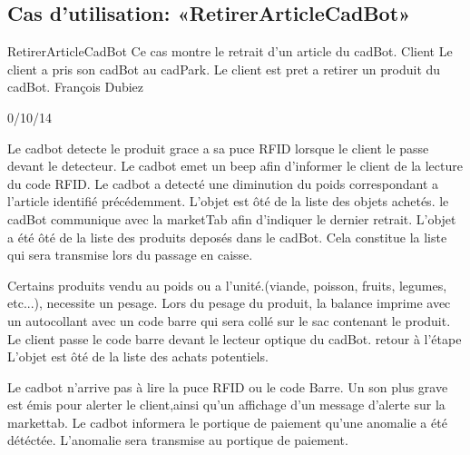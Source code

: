 \subsection{Cas d'utilisation: «RetirerArticleCadBot» }

\startCU
\nom RetirerArticleCadBot
\but Ce cas montre le retrait d'un article du cadBot.
\acteur Client
\precondition Le client a pris son cadBot au cadPark.
\declenchement Le client est pret a retirer un produit du cadBot.
\auteur François Dubiez
\date 30/10/14

\nominal %
\startnominal
\etape[SA1][SA2] Le cadbot detecte le produit grace a sa puce RFID lorsque le client le passe devant le detecteur. 
\etape[RETOUR] Le cadbot emet un beep afin d'informer le client de la lecture du code RFID.
\etape Le cadbot a detecté une diminution du poids correspondant a l'article identifié précédemment.
\etape L'objet est ôté de la liste des objets achetés.
\etape le cadBot communique avec la marketTab afin d'indiquer le dernier retrait.
\stopnominal
\postcondition L'objet a été ôté de la liste des produits deposés dans le cadBot. Cela constitue la liste qui sera transmise lors du passage en caisse.

\alternatifs %
\startalternatif[SA1] %
  \etape Certains produits vendu au poids ou a l'unité.(viande, poisson, fruits, legumes, etc...), necessite un pesage.
  \etape Lors du pesage du produit, la balance imprime avec un autocollant avec un code barre qui sera collé sur le sac contenant le produit.
  \etape Le client passe le code barre devant le lecteur optique du cadBot.
  \etape retour à l'étape \in[RETOUR]
\stopcondition
\postcondition L'objet est ôté de la liste des achats potentiels.
\stopalternatif


\exception %
\startalternatif[SA1]
   \etape Le cadbot n'arrive pas à lire la puce RFID ou le code Barre.
   \etape Un son plus grave est émis pour alerter le client,ainsi qu'un affichage d'un message d'alerte sur la markettab.
   \etape Le cadbot informera le portique de paiement qu'une anomalie a été détéctée.
\stopcondition
\postcondition L'anomalie sera transmise au portique de paiement.
\stopalternatif
\stopCU
